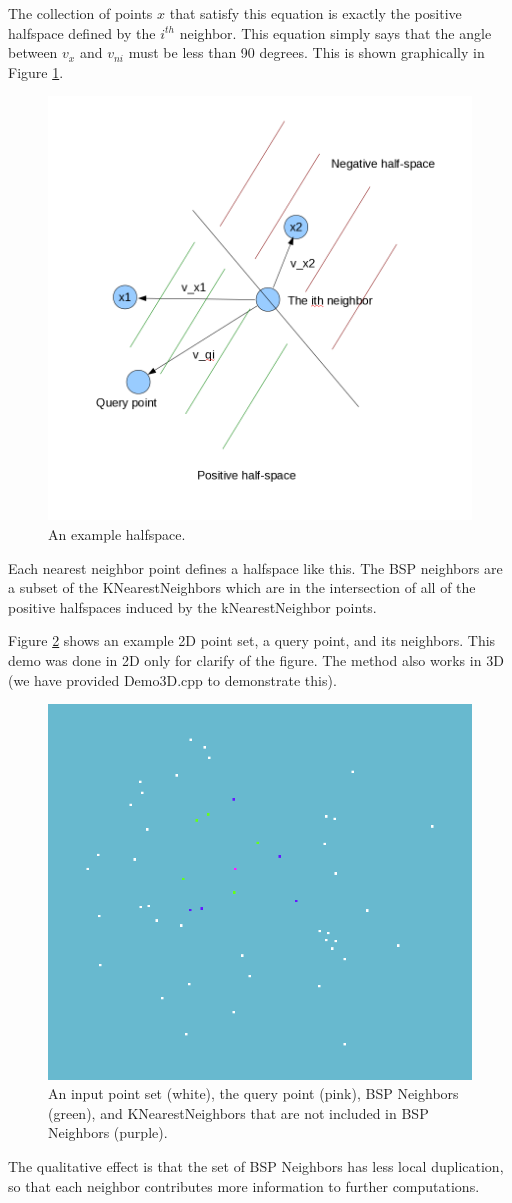 \documentclass{InsightArticle}
\begin{document}
The collection of points $x$ that satisfy this equation is exactly the positive halfspace defined by the $i^{th}$ neighbor. This equation simply says that the angle between $v_x$ and $v_{ni}$ must be less than 90 degrees. This is shown graphically in Figure \ref{fig:HalfSpace}.

\begin{figure}[H]
  \centering
  \includegraphics[width=0.4\linewidth]{images/HalfSpace}
  \caption{An example halfspace.}
  \label{fig:HalfSpace}
\end{figure}

Each nearest neighbor point defines a halfspace like this. The BSP neighbors are a subset of the KNearestNeighbors
which are in the intersection of all of the positive halfspaces induced by the kNearestNeighbor points.

Figure \ref{fig:BSPNeighbors} shows an example 2D point set, a query point, and its neighbors. This demo was done in 2D only for clarify of the figure. The method also works in 3D (we have provided Demo3D.cpp to demonstrate this).

\begin{figure}[H]
  \centering
  \includegraphics[width=0.4\linewidth]{images/BSPNeighbors}
  \caption{An input point set (white), the query point (pink), BSP Neighbors (green), and KNearestNeighbors that are not included in BSP Neighbors (purple).}
  \label{fig:BSPNeighbors}
\end{figure}

The qualitative effect is that the set of BSP Neighbors has less local duplication, so that each neighbor contributes more information to further computations.
\end{document}

